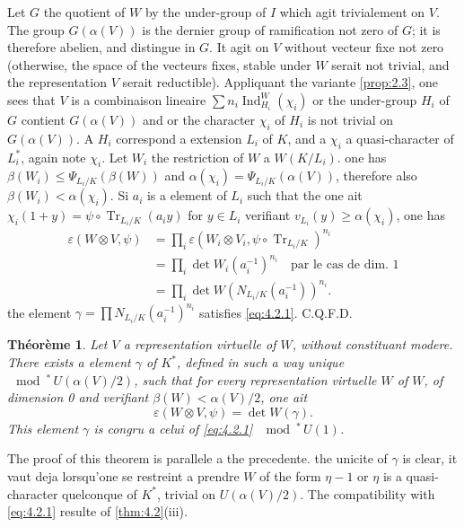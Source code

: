\documentclass[12pt,a4paper]{article}
\theoremstyle{plain}
\newtheorem{theorem}{Th\'eor\`eme}[section]
\theoremstyle{definition}
\theoremstyle{remark}
\DeclareMathOperator{\Ind}{Ind}
\DeclareMathOperator{\Tr}{Tr}
\providecommand{\Tr}{\operatorname{Tr}}
\begin{document}
Let $G$ the quotient of $W$ by the under-group of $I$ which agit trivialement on $V$. The group $G(\alpha(V))$ is the dernier group of ramification not zero of $G$; it is therefore abelien, and distingue in $G$. It agit on $V$ without vecteur fixe not zero (otherwise, the space of the vecteurs fixes, stable under $W$ serait not trivial, and the representation $V$ serait reductible). Appliquant the variante \ref{prop:2.3}, one sees that $V$ is a combinaison lineaire $\sum n_i \Ind_{H_i}^W(\chi_i)$ or the under-group $H_i$ of $G$ contient $G(\alpha(V))$ and or the character $\chi_i$ of $H_i$ is not trivial on $G(\alpha(V))$. A $H_i$ correspond a extension $L_i$ of $K$, and a $\chi_i$ a quasi-character of $L_i^*$, again note $\chi_i$. Let $W_i$ the restriction of $W$ a $W(K/L_i)$. one has $\beta(W_i) \leq \Psi_{L_i/K}(\beta(W))$ and $\alpha(\chi_i) = \Psi_{L_i/K}(\alpha(V))$, therefore also $\beta(W_i) < \alpha(\chi_i)$. Si $a_i$ is a element of $L_i$ such that the one ait $\chi_i(1+y) = \psi \circ \Tr_{L_i/K}(a_i y)$ for $y \in L_i$ verifiant $v_{L_i}(y) \geq \alpha(\chi_i)$, one has
\begin{align*}
\varepsilon(W \otimes V, \psi) &= \prod_i \varepsilon(W_i \otimes V_i, \psi \circ \Tr_{L_i/K})^{n_i} \\
&= \prod_i \det W_i(a_i^{-1})^{n_i} \quad \text{par le cas de dim.~1} \\
&= \prod_i \det W(N_{L_i/K}(a_i^{-1}))^{n_i}.
\end{align*}
the element $\gamma = \prod N_{L_i/K}(a_i^{-1})^{n_i}$ satisfies \eqref{eq:4.2.1}. C.Q.F.D.

\begin{theorem}\label{thm:4.6}
Let $V$ a representation virtuelle of $W$, without constituant modere. There exists a element $\gamma$ of $K^*$, defined in such a way unique $\mod^*\, U(\alpha(V)/2)$, such that for every representation virtuelle $W$ of $W$, of dimension 0 and verifiant $\beta(W) < \alpha(V)/2$, one ait
\begin{equation}\label{eq:4.6.1}
\varepsilon(W \otimes V, \psi) = \det W(\gamma).
\end{equation}
This element $\gamma$ is congru a celui of \eqref{eq:4.2.1} $\mod^*\, U(1)$.
\end{theorem}

The proof of this theorem is parallele a the precedente. the unicite of $\gamma$ is clear, it vaut deja lorsqu'one se restreint a prendre $W$ of the form $\eta - 1$ or $\eta$ is a quasi-character quelconque of $K^*$, trivial on $U(\alpha(V)/2)$. The compatibility with \eqref{eq:4.2.1} resulte of \ref{thm:4.2}(iii).
\end{document}
